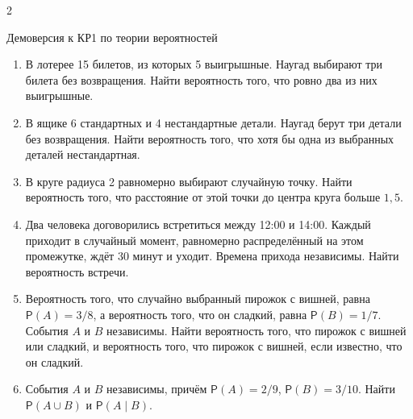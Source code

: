 \documentclass[a4paper,10pt]{article}
\newcommand{\PP}{\mathsf P}
\begin{document}
\begin{multicols}{2}
\begin{center}
{\large\mdseries Демоверсия к КР1 по теории вероятностей}
\end{center}
\vspace{4pt}
\begin{enumerate}
\item\begin{minipage}[t]{\linewidth} В лотерее 15 билетов, из которых 5 выигрышные. Наугад выбирают три билета без возвращения. Найти вероятность того, что ровно два из них выигрышные.
\end{minipage}

\item\begin{minipage}[t]{\linewidth} В ящике 6 стандартных и 4 нестандартные детали. Наугад берут три детали без возвращения. Найти вероятность того, что хотя бы одна из выбранных деталей нестандартная.
\end{minipage}

\item\begin{minipage}[t]{\linewidth} В круге радиуса 2 равномерно выбирают случайную точку. Найти вероятность того, что расстояние от этой точки до центра круга больше $1{,}5$.
\end{minipage}

\item\begin{minipage}[t]{\linewidth} Два человека договорились встретиться между 12:00 и 14:00. Каждый приходит в случайный момент, равномерно распределённый на этом промежутке, ждёт 30 минут и уходит. Времена прихода независимы. Найти вероятность встречи.

\end{minipage}

\item\begin{minipage}[t]{\linewidth} Вероятность того, что случайно выбранный пирожок с вишней, равна $\PP(A)=3/8$, а вероятность того, что он сладкий, равна $\PP(B)=1/7$. События $A$ и $B$ независимы. Найти вероятность того, что пирожок с вишней или сладкий, и вероятность того, что пирожок с вишней, если известно, что он сладкий.
\end{minipage}

\item\begin{minipage}[t]{\linewidth} События $A$ и $B$ независимы, причём $\PP(A)=2/9$, $\PP(B)=3/10$. Найти $\PP(A\cup B)$ и $\PP(A\mid B)$.


\end{minipage}
\end{enumerate}
\end{multicols}
\end{document}
